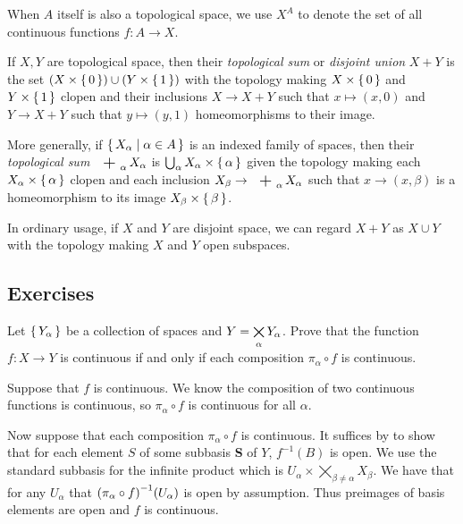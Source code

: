 \documentclass[letterpaper, 11pt]{article}
\begin{document}
When $A$ itself is also a topological space, we use $X^{A}$ to denote the set of all continuous functions $f\colon A \to X$.

\clearpage

\begin{defn}
  If $X, Y$ are topological space, then their \emph{topological sum} or \emph{disjoint union} $X + Y$ is the set $(X \times \set{0}) \cup (Y \times \set{1})$ with the topology making $X \times \set{0}$ and $Y \times \set{1}$ clopen and their inclusions $X \to X + Y$ such that $x \mapsto (x, 0)$ and $Y \to X + Y$ such that $y \mapsto (y, 1)$ homeomorphisms to their image.

  More generally, if $\set{X_{\alpha} | \alpha \in A}$ is an indexed family of spaces, then their \emph{topological sum} $\bigplus_{\alpha} X_{\alpha}$ is $\bigcup_{\alpha} X_{\alpha} \times \set{\alpha}$ given the topology making each $X_{\alpha} \times \set{\alpha}$ clopen and each inclusion $X_{\beta} \to \bigplus_{\alpha} X_{\alpha}$ such that $x \to (x, \beta)$ is a homeomorphism to its image $X_{\beta} \times \set{\beta}$.
\end{defn}

In ordinary usage, if $X$ and $Y$ are disjoint space, we can regard $X + Y$ as $X \cup Y$ with the topology making $X$ and $Y$ open subspaces.

\clearpage

\subsection*{Exercises}

\begin{exercise}\label{exercise: Bredon 1.8.3}
  Let $\set{Y_{\alpha}}$ be a collection of spaces and $Y = \bigtimes\limits_{\alpha} Y_{\alpha}$.
  Prove that the function $f\colon X \to Y$ is continuous if and only if each composition $\pi_{\alpha} \circ f$ is continuous.
\end{exercise}
\begin{pf}
  Suppose that $f$ is continuous.
  We know the composition of two continuous functions is continuous, so $\pi_{\alpha} \circ f$ is continuous for all $\alpha$.

  Now suppose that each composition $\pi_{\alpha} \circ f$ is continuous.
  It suffices by  to show that for each element $S$ of some subbasis \textbf{S} of $Y$, $f^{-1}(B)$ is open.
  We use the standard subbasis for the infinite product which is $U_{\alpha} \times \bigtimes_{\beta \neq \alpha} X_{\beta}$.
  We have that for any $U_{\alpha}$ that $\pqty{\pi_{\alpha} \circ f}^{-1}(U_{\alpha})$ is open by assumption.
  Thus preimages of basis elements are open and $f$ is continuous.
\end{pf}
\end{document}
